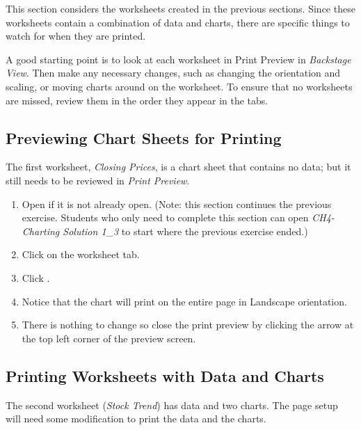 This section considers the worksheets created in the previous sections. Since these worksheets contain a combination of data and charts, there are specific things to watch for when they are printed.

A good starting point is to look at each worksheet in Print Preview in \textit{Backstage View}. Then make any necessary changes, such as changing the orientation and scaling, or moving charts around on the worksheet. To ensure that no worksheets are missed, review them in the order they appear in the tabs.

\subsection{Previewing Chart Sheets for Printing}

The first worksheet, \textit{Closing Prices}, is a chart sheet that contains no data; but it still needs to be reviewed in \textit{Print Preview}.

\begin{enumbox}
	\begin{enumerate}
		\item Open  if it is not already open. (Note: this section continues the previous exercise. Students who only need to complete this section can open \textit{CH4-Charting Solution 1\_3} to start where the previous exercise ended.)
		\item Click on the  worksheet tab.
		\item Click .
		\item Notice that the chart will print on the entire page in Landscape orientation.
		\item There is nothing to change so close the print preview by clicking the arrow at the top left corner of the preview screen.
	\end{enumerate}
\end{enumbox}
	
\subsection{Printing Worksheets with Data and Charts}

The second worksheet (\textit{Stock Trend}) has data and two charts. The page setup will need some modification to print the data and the charts.

